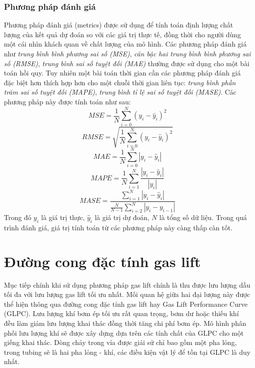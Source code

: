 \documentclass[12pt,a4paper]{report}
\begin{document}
\subsubsection{Phương pháp đánh giá}
Phương pháp đánh giá (metrics) được sử dụng để tính toán định lượng chất lượng của kết quả dự đoán so với các giá trị thực tế, đồng thời cho người dùng một cái nhìn khách quan về chất lượng của mô hình. Các phương pháp đánh giá như \textit{trung bình bình phương sai số (MSE)}, \textit{căn bậc hai trung bình bình phương sai số (RMSE)}, \textit{trung bình sai số tuyệt đối (MAE)} thường được sử dụng cho một bài toán hồi quy. Tuy nhiên một bài toán thời gian cần các phương pháp đánh giá đặc biệt hơn thích hợp hơn cho một chuỗi thời gian liên tục: \textit{trung bình phần trăm sai số tuyệt đối (MAPE)}, \textit{trung bình tỉ lệ sai số tuyệt đối (MASE)}. Các phương pháp này được tính toán như sau:
	\begin{equation}
		MSE = \frac{1}{N}\sum_{i=0}^N(y_i - \widehat y_i)^2
	\end{equation}
	\begin{equation}
		RMSE = \sqrt{\frac{1}{N}\sum_{i=0}^N(y_i - \widehat y_i)^2}
	\end{equation}
	\begin{equation}
		MAE = \frac{1}{N}\sum_{i=0}^N|y_i - \widehat y_i|
	\end{equation}
	\begin{equation}
		MAPE = \frac{1}{N}\sum_{i=1}^N\frac{|y_i - \widehat y_i|}{|y_i|}
	\end{equation}
	\begin{equation}
		MASE = \frac{\sum_{i=1}^N|y_i - \widehat y_i|}{\frac{N}{N - 1}\sum_{i=2}^N|y_i - y_{i-1}|}
	\end{equation}
Trong đó $y_i$ là giá trị thực, $\widehat y_i$ là giá trị dự đoán, $N$ là tổng số dữ liệu. Trong quá trình đánh giá, giá trị tính toán từ các phương pháp này càng thấp càn tốt.\\

\section{Đường cong đặc tính gas lift}
Mục tiếp chính khi sử dụng phương pháp gas lift chính là thu được lưu lượng dầu tối đa với lưu lượng gas lift tối ưu nhất. Mối quan hệ giữa hai đại lượng này được thể hiện thông qua đường cong đặc tính gas lift hay Gas Lift Performance Curve (GLPC). Lưu lượng khí bơm ép tối ưu rất quan trọng, bơm dư hoặc thiếu khí đều làm giảm lưu lượng khai thác đồng thời tăng chi phí bơm ép. Mô hình phân phối lưu lượng khí sẽ được xây dựng dựa trên các tính chất của GLPC cho một giếng khai thác. Dòng chảy trong vỉa được giải sử chỉ bao gồm một pha lỏng, trong tubing sẽ là hai pha lỏng - khí, các điều kiện vật lý để tồn tại GLPC là duy nhất.\\
\end{document}
